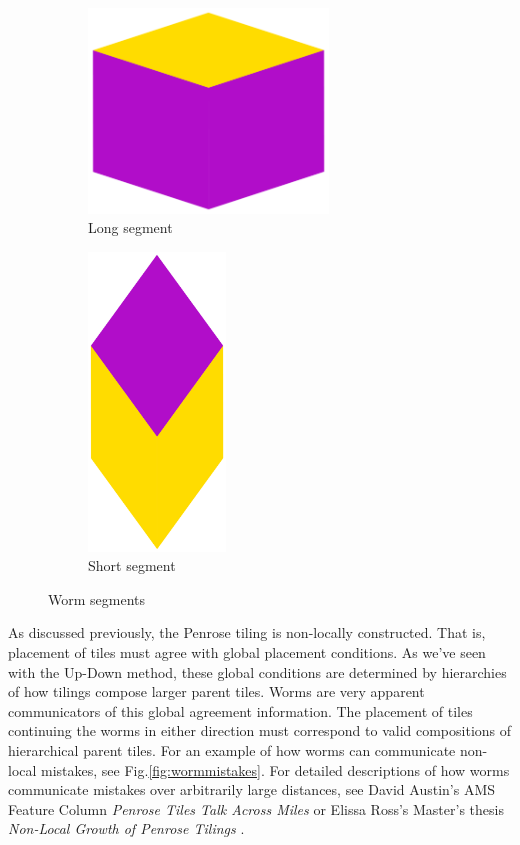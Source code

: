 \documentclass[
  oneside,
  11pt, a4paper,
  footinclude=true,
  headinclude=true,
  cleardoublepage=empty
]{scrbook}
\begin{document}
\begin{figure}[h]
\centering
\begin{subfigure}[b]{0.4\textwidth}
\centering
\includegraphics[width=0.7\textwidth]{WideWorm}
\caption{Long segment}
\end{subfigure}\hfill
\begin{subfigure}[b]{0.4\textwidth}
\centering
\includegraphics[width=0.4\textwidth]{TallWorm}
\caption{Short segment}
\end{subfigure}
\caption{Worm segments}
\label{fig:wormparts}
\end{figure}

As discussed previously, the Penrose tiling is non-locally constructed. That is, placement of tiles must agree with global placement conditions. As we've seen with the Up-Down method, these global conditions are determined by hierarchies of how tilings compose larger parent tiles. Worms are very apparent communicators of this global agreement information. The placement of tiles continuing the worms in either direction must correspond to valid compositions of hierarchical parent tiles. For an example of how worms can communicate non-local mistakes, see Fig.\ref{fig:wormmistakes}. For detailed descriptions of how worms communicate mistakes over arbitrarily large distances, see David Austin's AMS Feature Column \textit{Penrose Tiles Talk Across Miles} \cite{Austin2007} or Elissa Ross's Master's thesis \textit{Non-Local Growth of Penrose Tilings} \cite{Ross}.
\end{document}

